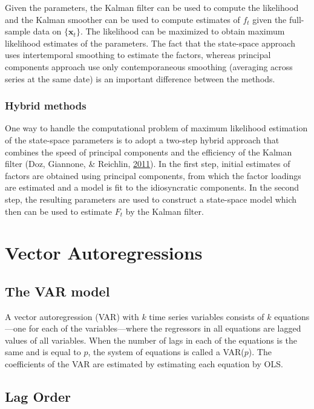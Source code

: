 \documentclass[12pt,twoside]{reedthesis}
\begin{document}
Given the parameters, the Kalman filter can be used to compute the likelihood and the Kalman smoother can be used to compute estimates of \(f_{t}\) given the full-sample data on \(\{\bm x_{t}\}\). The likelihood can be maximized to obtain maximum likelihood estimates of the parameters. The fact that the state-space approach uses intertemporal smoothing to estimate the factors, whereas principal components approach use only contemporaneous smoothing (averaging across series at the same date) is an important difference between the methods.

\hypertarget{hybrid-methods}{%
\subsubsection{Hybrid methods}\label{hybrid-methods}}

One way to handle the computational problem of maximum likelihood estimation of the state-space parameters is to adopt a two-step hybrid approach that combines the speed of principal components and the efficiency of the Kalman filter (Doz, Giannone, \& Reichlin, \protect\hyperlink{ref-dozetal:2011}{2011}). In the first step, initial estimates of factors are obtained using principal components, from which the factor loadings are estimated and a model is fit to the idiosyncratic components. In the second step, the resulting parameters are used to construct a state-space model which then can be used to estimate \(F_{t}\) by the Kalman filter.

\hypertarget{vector-autoregressions}{%
\section{Vector Autoregressions}\label{vector-autoregressions}}

\hypertarget{the-var-model}{%
\subsection{The VAR model}\label{the-var-model}}

A vector autoregression (VAR) with \(k\) time series variables consists of \(k\) equations---one for each of the variables---where the regressors in all equations are lagged values of all variables. When the number of lags in each of the equations is the same and is equal to \(p\), the system of equations is called a VAR(\(p\)). The coefficients of the VAR are estimated by estimating each equation by OLS.

\hypertarget{lag-order}{%
\subsection{Lag Order}\label{lag-order}}
\end{document}
